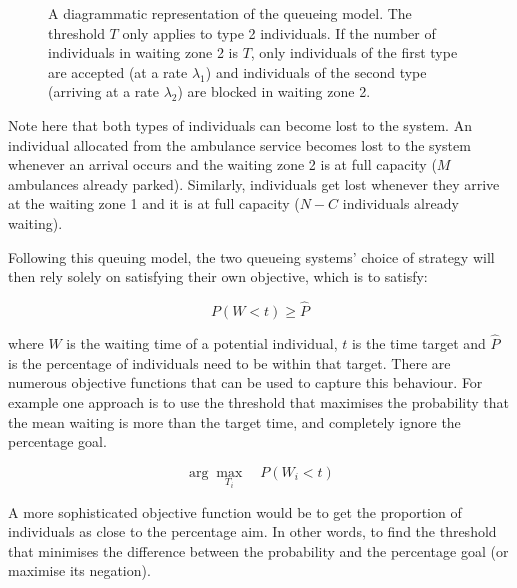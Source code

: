 \begin{figure}[h]
    \caption{A diagrammatic representation of the queueing model. 
    The threshold \(T\) only applies to type 2 individuals.
    If the number of individuals in waiting zone 2 is \(T\), only 
    individuals of the first type 
    are accepted (at a rate \(\lambda_1\)) and individuals of the second type 
    (arriving at a rate \(\lambda_2\)) are blocked in waiting zone 2.}
    \label{fig:diagram_of_queueing_system}
\end{figure}

Note here that both types of individuals can become lost to the system. 
An individual allocated from the ambulance service becomes lost to the system 
whenever 
an arrival occurs and the waiting zone 2 is at full capacity (\(M\) 
ambulances already parked).
Similarly, individuals get lost whenever they arrive at the waiting 
zone 1 and it is at full capacity (\(N - C\) individuals already waiting).

Following this queuing model, the two queueing systems' choice of strategy will 
then rely solely on satisfying their own 
objective, which is to satisfy:

\begin{equation}
    P(W < t) \geq \hat{P}
\end{equation}

where \(W\) is the waiting time of a potential individual, \(t\) is the time 
target and \(\hat{P}\) is the percentage of individuals need to be within that 
target. 
There are numerous objective functions that can be used to capture this 
behaviour. 
For example one approach is to use the threshold that maximises the probability 
that 
the mean waiting is more than the target time, and completely ignore the 
percentage goal.

\begin{equation}
    \arg \max_{T_i} \quad P(W_i < t)
\end{equation}

A more sophisticated objective function would be to get the proportion 
of individuals as close to the percentage aim. 
In other words, to find the threshold that minimises the difference between the 
probability and the percentage goal (or maximise its negation).

